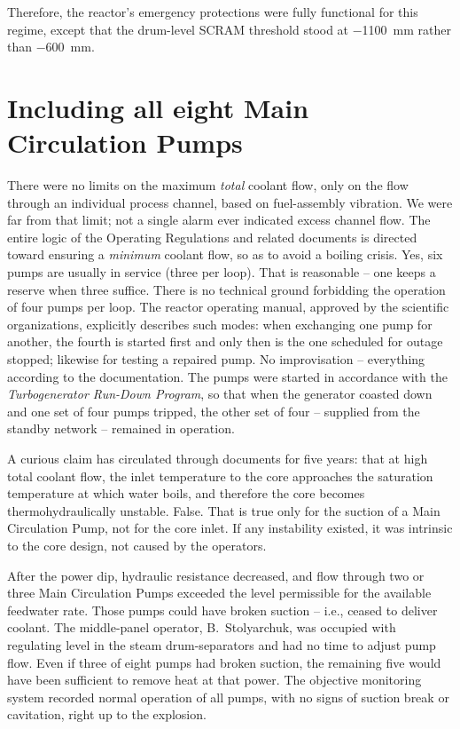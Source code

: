 \documentclass[openright]{bookest}
\begin{document}
Therefore, the reactor's emergency protections were fully functional for this regime, except that the drum-level SCRAM threshold stood at \qty{-1100}{\milli\metre} rather than \qty{-600}{\milli\metre}.

\section{Including all eight Main Circulation Pumps}

There were no limits on the maximum \textit{total} coolant flow, only on the flow through an individual process channel, based on fuel-assembly vibration. We were far from that limit; not a single alarm ever indicated excess channel flow. The entire logic of the Operating Regulations and related documents is directed toward ensuring a \textit{minimum} coolant flow, so as to avoid a boiling crisis. Yes, six pumps are usually in service (three per loop). That is reasonable -- one keeps a reserve when three suffice. There is no technical ground forbidding the operation of four pumps per loop. The reactor operating manual, approved by the scientific organizations, explicitly describes such modes: when exchanging one pump for another, the fourth is started first and only then is the one scheduled for outage stopped; likewise for testing a repaired pump. No improvisation -- everything according to the documentation. The pumps were started in accordance with the \textit{Turbogenerator Run-Down Program}, so that when the generator coasted down and one set of four pumps tripped, the other set of four -- supplied from the standby network -- remained in operation.

A curious claim has circulated through documents for five years: that at high total coolant flow, the inlet temperature to the core approaches the saturation temperature at which water boils, and therefore the core becomes thermohydraulically unstable. False. That is true only for the suction of a Main Circulation Pump, not for the core inlet. If any instability existed, it was intrinsic to the core design, not caused by the operators.

After the power dip, hydraulic resistance decreased, and flow through two or three Main Circulation Pumps exceeded the level permissible for the available feedwater rate. Those pumps could have broken suction -- i.e., ceased to deliver coolant. The middle-panel operator, B.~Stolyarchuk, was occupied with regulating level in the steam drum-separators and had no time to adjust pump flow. Even if three of eight pumps had broken suction, the remaining five would have been sufficient to remove heat at that power. The objective monitoring system recorded normal operation of all pumps, with no signs of suction break or cavitation, right up to the explosion.
\end{document}
